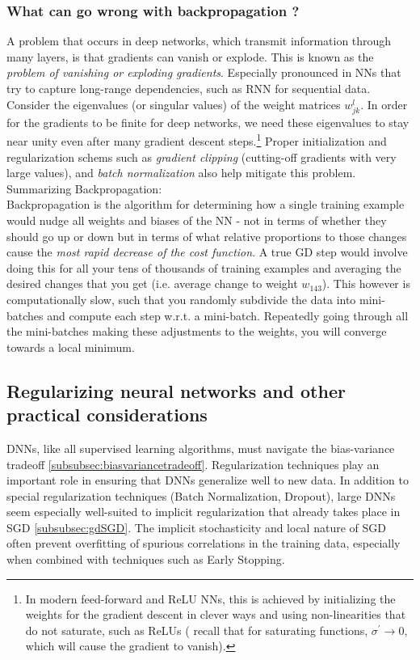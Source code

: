 \subsubsection{What can go wrong with backpropagation ?}
\label{subsubsec:dnnBackpropagationProblems}
A problem that occurs in deep networks, which transmit information through many layers, is that gradients can vanish or explode. This is known as the \emph{problem of vanishing or exploding gradients}. Especially pronounced in NNs that try to capture long-range dependencies, such as RNN for sequential data. 
Consider the eigenvalues (or singular values) of the weight matrices $w^l_{jk}$. In order for the gradients to be finite for deep networks, we need these eigenvalues to stay near unity even after many gradient descent steps.\footnote{ In modern feed-forward and ReLU NNs, this is achieved by initializing the weights for the gradient descent in clever ways and using non-linearities that do not saturate, such as ReLUs ( recall that for saturating functions, $\sigma^\prime \rightarrow 0$, which will cause the gradient to vanish).}
Proper initialization and regularization schems such as \emph{gradient clipping} (cutting-off gradients with very large values), and \emph{batch normalization} also help mitigate this problem.\\
Summarizing Backpropagation:\\
Backpropagation is the algorithm for determining how a single training example would nudge all weights and biases of the NN - not in terms of whether they should go up or down but in terms of what relative proportions to those changes cause the \emph{most rapid decrease of the cost function}. A true GD step would involve doing this for all your tens of thousands of training examples and averaging the desired changes that you get (i.e. average change to weight $w_{143}$). This however is computationally slow, such that you randomly subdivide the data into mini-batches and compute each step w.r.t. a mini-batch. Repeatedly going through all the mini-batches making these adjustments to the weights, you will converge towards a local minimum.
\subsection{Regularizing neural networks and other practical considerations}
\label{subsec:dnnRegularizingPractical}
DNNs, like all supervised learning algorithms, must navigate the bias-variance tradeoff \ref{subsubsec:biasvariancetradeoff}.
Regularization techniques play an important role in ensuring that DNNs generalize well to new data. In addition to special regularization techniques (Batch Normalization, Dropout), large DNNs seem especially well-suited to implicit regularization that already takes place in SGD \ref{subsubsec:gdSGD}. The implicit stochasticity and local nature of SGD often prevent overfitting of spurious correlations in the training data, especially when combined with techniques such as Early Stopping.
